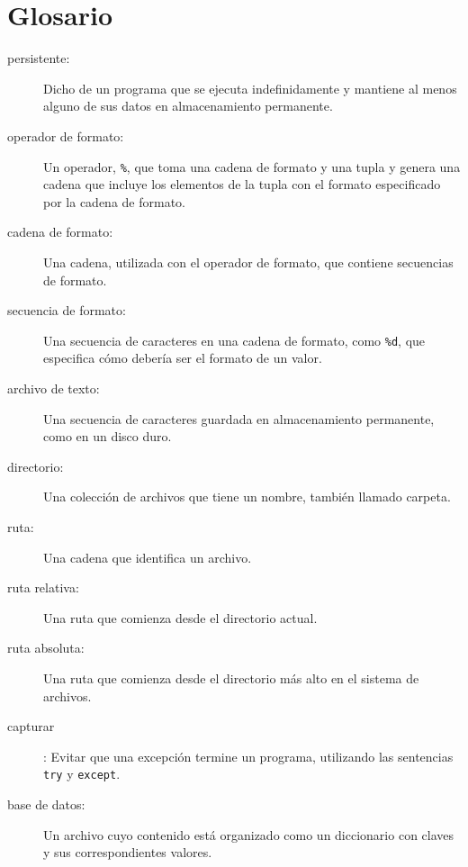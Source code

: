 \documentclass[10pt]{book}
\begin{document}
\section{Glosario}

\begin{description}

\item[persistente:] Dicho de un programa que se ejecuta indefinidamente
y mantiene al menos alguno de sus datos en almacenamiento permanente.

\item[operador de formato:] Un operador, {\tt \%}, que toma una cadena
de formato y una tupla y genera una cadena que incluye
los elementos de la tupla con el formato especificado por la cadena de formato.

\item[cadena de formato:] Una cadena, utilizada con el operador de formato, que
contiene secuencias de formato.

\item[secuencia de formato:] Una secuencia de caracteres en una cadena de formato,
como {\tt \%d}, que especifica cómo debería ser el formato de un valor.

\item[archivo de texto:] Una secuencia de caracteres guardada en almacenamiento
permanente, como en un disco duro.

\item[directorio:] Una colección de archivos que tiene un nombre, también llamado carpeta.

\item[ruta:] Una cadena que identifica un archivo.

\item[ruta relativa:] Una ruta que comienza desde el directorio actual.

\item[ruta absoluta:] Una ruta que comienza desde el directorio más alto
en el sistema de archivos.

\item[capturar]: Evitar que una excepción termine
un programa, utilizando las sentencias {\tt try}
y {\tt except}.

\item[base de datos:] Un archivo cuyo contenido está organizado como un diccionario
con claves y sus correspondientes valores.


\end{description}
\end{document}
